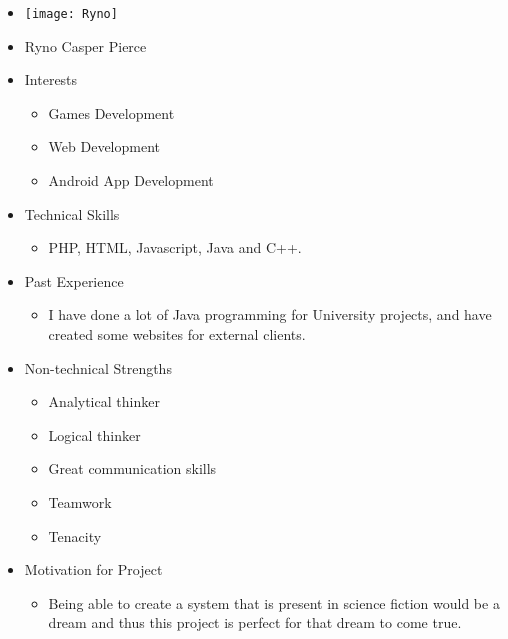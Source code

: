 
\begin{itemize}
	\item[] \texttt{[image: Ryno]}
	\item[] Ryno Casper Pierce
	\item Interests
	\begin{itemize}
		\item Games Development
		\item Web Development
		\item Android App Development
	\end{itemize}
	\item Technical Skills
	\begin{itemize}
		\item[] PHP, HTML, Javascript, Java and C++.
	\end{itemize}
	\item Past Experience
	\begin{itemize}
		\item[] I have done a lot of Java programming for University projects, and have created some websites for external clients.
	\end{itemize}
	\item Non-technical Strengths
	\begin{itemize}
		\item Analytical thinker
		\item Logical thinker
		\item Great communication skills
		\item Teamwork
		\item Tenacity
	\end{itemize}
	\item Motivation for Project
	\begin{itemize}
		\item[] Being able to create a system that is present in science fiction would be a dream and thus this project is perfect for that dream to come true.
	\end{itemize}
\end{itemize}